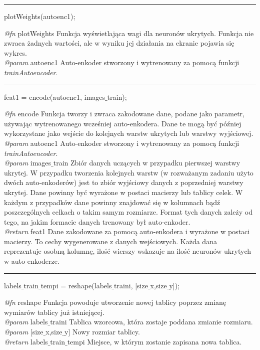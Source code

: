 \vspace{1cm}
\hrule
\vspace{1cm}

\noindent plotWeights(autoenc1);
\vspace{1cm}

\noindent \textit{@fn} plotWeights Funkcja wyświetlająca wagi dla neuronów ukrytych. Funkcja nie zwraca żadnych wartości, ale w wyniku jej działania na ekranie pojawia się wykres.
\\ \textit{@param} autoenc1 Auto-enkoder stworzony i wytrenowany za pomocą funkcji \textit{trainAutoencoder}.

\vspace{1cm}
\hrule
\vspace{1cm}

\noindent feat1 = encode(autoenc1, images$\_$train);
\vspace{1cm}

\noindent \textit{@fn} encode Funkcja tworzy i zwraca zakodowane dane, podane jako parametr, używając wytrenowanego wcześniej auto-enkodera. Dane te mogą być później wykorzystane jako wejście do kolejnych warstw ukrytych lub warstwy wyjściowej.
\\ \textit{@param} autoenc1 Auto-enkoder stworzony i wytrenowany za pomocą funkcji \textit{trainAutoencoder}.
\\ \textit{@param} images$\_$train Zbiór danych uczących w przypadku pierwszej warstwy ukrytej. W przypadku tworzenia kolejnych warstw (w rozważanym zadaniu użyto dwóch auto-enkoderów) jest to zbiór wyjściowy danych z poprzedniej warstwy ukrytej. Dane powinny być wyrażone w postaci macierzy lub tablicy celek. W każdym z przypadków dane powinny znajdować się w kolumnach bądź poszczególnych celkach o takim samym rozmiarze. Format tych danych zależy od tego, na jakim formacie danych trenowany był auto-enkoder.
\\ \textit{@return} feat1 Dane zakodowane za pomocą auto-enkodera i wyrażone w postaci macierzy. To cechy wygenerowane z danych wejściowych. Każda dana reprezentuje osobną kolumnę, ilość wierszy wskazuje na ilość neuronów ukrytych w auto-enkoderze.

\vspace{1cm}
\hrule
\vspace{1cm}

\noindent labels$\_$train$\_$temp{i} = reshape(labels$\_$train{i}, [size$\_$x,size$\_$y]);
\vspace{1cm}

\noindent \textit{@fn} reshape Funkcja powoduje utworzenie nowej tablicy poprzez zmianę wymiarów tablicy już istniejącej.
\\ \textit{@param} labels$\_$train{i} Tablica wzorcowa, która zostaje poddana zmianie rozmiaru.
\\ \textit{@param} [size$\_$x,size$\_$y] Nowy rozmiar tablicy.
\\ \textit{@return} labels$\_$train$\_$temp{i} Miejsce, w którym zostanie zapisana nowa tablica.


